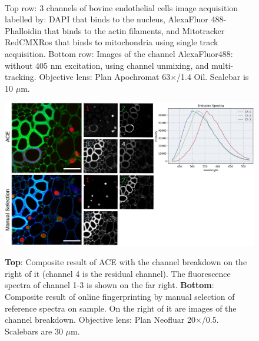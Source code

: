 \begin{figure}[h!]
\\
\caption{Top row: 3 channels of bovine endothelial cells image acquisition labelled by: DAPI that binds to the nucleus, AlexaFluor 488-Phalloidin that binds to the actin filaments, and Mitotracker RedCMXRos that binds to mitochondria using single track acquisition. 
Bottom row: Images of the channel AlexaFluor488: without 405 nm excitation, using channel unmixing, and multi-tracking. 
Objective lens: Plan Apochromat 63$\times$/1.4 Oil. 
Scalebar is 10 $\mu$m.} 
\label{fig:bovendo}
\end{figure}

\begin{figure}[h!]
\centering
\includegraphics[width=\columnwidth]{Exp_3_LSM/Figures/MS3/ACEolfp}\\
\caption{\textbf{Top}: Composite result of ACE with the channel breakdown on the right of it (channel 4 is the residual channel).
The fluorescence spectra of channel 1-3 is shown on the far right.  
\textbf{Bottom}: Composite result of online fingerprinting by manual selection of reference spectra on sample. On the right of it are images of the channel breakdown. 
Objective lens: Plan Neofluar 20$\times$/0.5. 
Scalebars are 30 $\mu$m.}
\label{fig:aceolfp}
\end{figure}

